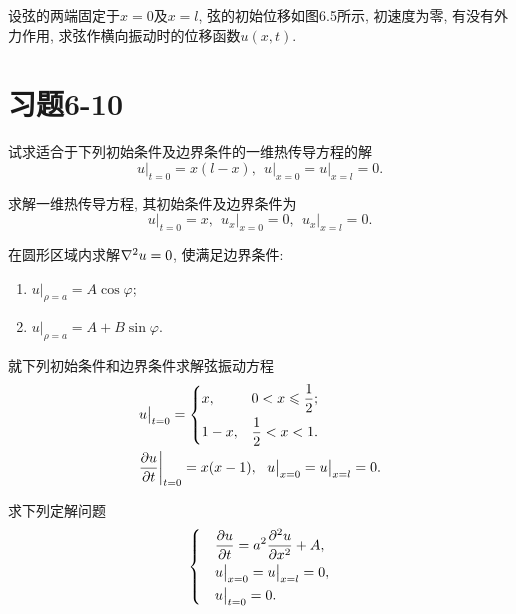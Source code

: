 \begin{yyEx}
	设弦的两端固定于$x = 0$及$x = l$, 弦的初始位移如图6.5所示, 初速度为零, 有没有外力作用, 求弦作横向振动时的位移函数$u(x,t)$.
\end{yyEx}

\section{习题6-10}

\begin{yyEx}
	试求适合于下列初始条件及边界条件的一维热传导方程的解
	\begin{equation*}
		u\big\vert_{t = 0} = x(l-x),~~u\big\vert_{x = 0} = u\big\vert_{x = l} = 0.
	\end{equation*}
\end{yyEx}

\begin{yyEx}
	求解一维热传导方程, 其初始条件及边界条件为
	\begin{equation*}
	u\big\vert_{t = 0} = x,~~u_x\big\vert_{x = 0} = 0,~~ u_x\big\vert_{x = l} = 0.
	\end{equation*}
\end{yyEx}

\begin{yyEx}
	在圆形区域内求解$\nabla^2u = 0$, 使满足边界条件:
	\begin{enumerate}
		\item $u\big\vert_{\rho = a} = A\cos\varphi$;
		\item $u\big\vert_{\rho = a} = A+B\sin\varphi$.
	\end{enumerate}
\end{yyEx}

\begin{yyEx}
	就下列初始条件和边界条件求解弦振动方程
	\begin{equation*}
		\begin{split}
			&u\big\vert_{t = 0} = \begin{dcases}
			x,&0<x\leqslant \frac{1}{2};\\
			1-x,&\frac{1}{2}<x<1.
			\end{dcases} \\
			&\frac{\partial u}{\partial t}\bigg\vert_{t = 0} = x(x-1),~~u\big\vert_{x = 0} = u\big\vert_{x = l} = 0.
		\end{split}		
	\end{equation*}
\end{yyEx}

\begin{yyEx}
	求下列定解问题
	\begin{equation*}
		\begin{dcases}
			&\frac{\partial u}{\partial t} = a^2\frac{\partial ^2u}{\partial x^2} + A,\\
			&u\big\vert_{x = 0} = u\big\vert_{x = l} = 0,\\
			&u\big\vert_{t = 0} = 0.
		\end{dcases}
	\end{equation*}
\end{yyEx}

